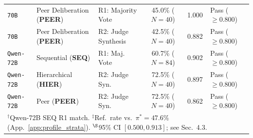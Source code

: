 \begin{table}[t]
\begin{tabular}{@{}lllccl@{}}
\texttt{70B} & Peer Deliberation (\textbf{PEER}) & R1: Majority Vote & 45.0\% ($N=40$) & 1.000 & Pass ($\ge 0.800$) \\
\texttt{70B} & Peer Deliberation (\textbf{PEER}) & R2: Judge Synthesis & 42.5\% ($N=40$) & 0.882 & Pass ($\ge 0.800$) \\
\midrule
\texttt{Qwen-72B} & Sequential (\textbf{SEQ}) & R1: Maj. Vote & 60.7\% ($N=84$) & 0.902 & Pass ($\ge 0.800$) \\
\texttt{Qwen-72B} & Hierarchical (\textbf{HIER}) & R2: Judge Syn. & 72.5\% ($N=40$) & 0.897 & Pass ($\ge 0.800$) \\
\texttt{Qwen-72B} & Peer (\textbf{PEER}) & R2: Judge Syn. & 72.5\% ($N=40$) & 0.862 & Pass ($\ge 0.800$) \\
\bottomrule
\multicolumn{6}{p{0.98\linewidth}}{\vspace{1pt}\footnotesize
$^\dagger$Qwen-72B SEQ R1 match. $^\ddagger$Ref.\ rate vs.\ $\pi^*=47.6\%$ (App.~\ref{app:profile_strata}). $^{\S}$95\% CI $[0.500, 0.913]$; see Sec.~4.3.}
\end{tabular}
\end{table}
